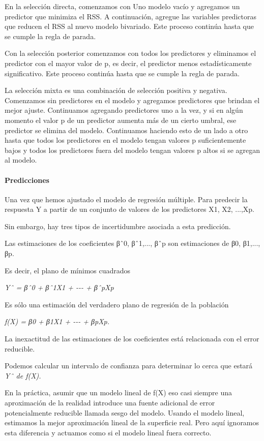 \documentclass[
  letterpaper,
  DIV=11,
  numbers=noendperiod]{scrartcl}
\let\oldparagraph\paragraph
\renewcommand{\paragraph}[1]{\oldparagraph{#1}\mbox{}}
\begin{document}
En la selección directa, comenzamos con Uno modelo vacío y agregamos un
predictor que minimiza el RSS. A continuación, agregue las variables
predictoras que reducen el RSS al nuevo modelo bivariado. Este proceso
continúa hasta que se cumple la regla de parada.

Con la selección posterior comenzamos con todos los predictores y
eliminamos el predictor con el mayor valor de p, es decir, el predictor
menos estadísticamente significativo. Este proceso continúa hasta que se
cumple la regla de parada.

La selección mixta es una combinación de selección positiva y negativa.
Comenzamos sin predictores en el modelo y agregamos predictores que
brindan el mejor ajuste. Continuamos agregando predictores uno a la vez,
y si en algún momento el valor p de un predictor aumenta más de un
cierto umbral, ese predictor se elimina del modelo. Continuamos haciendo
esto de un lado a otro hasta que todos los predictores en el modelo
tengan valores p suficientemente bajos y todos los predictores fuera del
modelo tengan valores p altos si se agregan al modelo.

\hypertarget{predicciones}{%
\paragraph{\texorpdfstring{\textbf{Predicciones}}{Predicciones}}\label{predicciones}}

Una vez que hemos ajustado el modelo de regresión múltiple. Para
predecir la respuesta Y a partir de un conjunto de valores de los
predictores X1, X2, ...,Xp.

Sin embargo, hay tres tipos de incertidumbre asociada a esta predicción.

Las estimaciones de los coeficientes βˆ0, βˆ1,..., βˆp son estimaciones
de β0, β1,..., βp.

Es decir, el plano de mínimos cuadrados

\emph{Yˆ = βˆ0 + βˆ1X1 + -\/-\/- + βˆpXp}

Es sólo una estimación del verdadero plano de regresión de la población

\emph{f(X) = β0 + β1X1 + -\/-\/- + βpXp.}

La inexactitud de las estimaciones de los coeficientes está relacionada
con el error reducible.

Podemos calcular un intervalo de confianza para determinar lo cerca que
estará \emph{Yˆ de f(X).}

En la práctica, asumir que un modelo lineal de f(X) eso casi siempre una
aproximación de la realidad introduce una fuente adicional de error
potencialmente reducible llamada sesgo del modelo. Usando el modelo
lineal, estimamos la mejor aproximación lineal de la superficie real.
Pero aquí ignoramos esta diferencia y actuamos como si el modelo lineal
fuera correcto.
\end{document}
